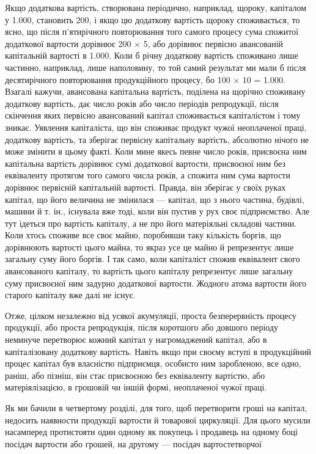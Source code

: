 Якщо додаткова вартість, створювана періодично, наприклад,
щороку, капіталом у 1.000, становить 200, і якщо цю додаткову вартість щороку споживається,
то ясно, що після п’ятирічного повторювання того самого
процесу сума спожитої додаткової вартости дорівнює 200 × 5, або
дорівнює первісно авансованій капітальній вартості в 1.000. Коли б річну додаткову вартість споживано лише
частинно, наприклад, лише наполовину, то той самий результат
ми мали б після десятирічного повторювання продукційного
процесу, бо 100 × 10 = 1.000. Взагалі кажучи, авансована
капітальна вартість, поділена на щорічно споживану додаткову
вартість, дає число років або число періодів репродукції, після
скінчення яких первісно авансований капітал споживається
капіталістом і тому зникає. Уявлення капіталіста, що він споживає
продукт чужої неоплаченої праці, додаткову вартість,
та зберігає первісну капітальну вартість, абсолютно нічого не
може змінити в цьому факті. Коли мине якесь певне число років,
присвоєна ним капітальна вартість дорівнює сумі додаткової
вартости, присвоєної ним без еквіваленту протягом того самого
числа років, а спожита ним сума вартости дорівнює первісній
капітальній вартості. Правда, він зберігає у своїх руках капітал,
що його величина не змінилася — капітал, що з нього частина,
будівлі, машини й т. ін., існувала вже тоді, коли він пустив у рух
своє підприємство. Але тут ідеться про вартість капіталу, а не
про його матеріяльні складові частини. Коли хтось споживе
все своє майно, поробивши таку кількість боргів, що дорівнюють
вартості цього майна, то якраз усе це майно й репрезентує лише
загальну суму його боргів. І так само, коли капіталіст спожив
еквівалент свого авансованого капіталу, то вартість цього капіталу
репрезентує лише загальну суму присвоєної ним задурно
додаткової вартости. Жодного атома вартости його старого капіталу
вже далі не існує.

Отже, цілком незалежно від усякої акумуляції, проста безперервність
процесу продукції, або проста репродукція, після
коротшого або довшого періоду неминуче перетворює кожний
капітал у нагромаджений капітал, або в капіталізовану додаткову
вартість. Навіть якщо при своєму вступі в продукційний процес
капітал був власністю підприємця, особисто ним заробленою,
все одно, раніш, або пізніш, він стає присвоєною без еквіваленту
вартістю, або матеріялізацією, в грошовій чи іншій формі, неоплаченої
чужої праці.

Як ми бачили в четвертому розділі, для того, щоб перетворити
гроші на капітал, недосить наявности продукції вартости й товарової
циркуляції. Для цього мусили насамперед протистояти
один одному як покупець і продавець на одному боці посідач
вартости або грошей, на другому — посідач вартостетворчої
\parbreak{}  %
